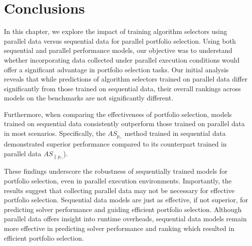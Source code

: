 \section{Conclusions}
In this chapter, we explore the impact of training algorithm selectors using parallel data versus sequential data for parallel portfolio selection. Using both sequential and parallel performance models, our objective was to understand whether incorporating data collected under parallel execution conditions would offer a significant advantage in portfolio selection tasks. Our initial analysis reveals that while predictions of algorithm selectors trained on parallel data differ significantly from those trained on sequential data, their overall rankings across models on the benchmarks are not significantly different. 

Furthermore, when comparing the effectiveness of portfolio selection, models trained on sequential data consistently outperform those trained on parallel data in most scenarios. Specifically, the $AS_{p_{\cap}}$ method trained in sequential data demonstrated superior performance compared to its counterpart trained in parallel data $AS_{\parallel p_{\cap}}$). 

These findings underscore the robustness of sequentially trained models for portfolio selection, even in parallel execution environments. Importantly, the results suggest that collecting parallel data may not be necessary for effective portfolio selection. Sequential data models are just as effective, if not superior, for predicting solver performance and guiding efficient portfolio selection. Although parallel data offers insight into runtime overheads, sequential data models remain more effective in predicting solver performance and ranking which resulted in efficient portfolio selection. 

